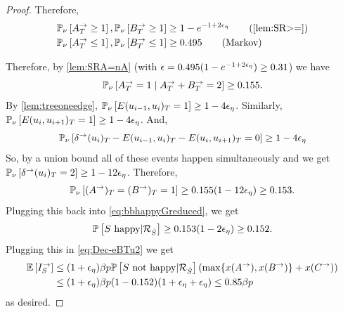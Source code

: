 \begin{proof}
Therefore,
\begin{align*}
&\PP{\nu}{A^\rightarrow_T \ge 1}, \PP{\nu}{B^\rightarrow_T\geq 1} \geq 1-e^{-1+2\eps_\eta}
 \tag{\cref{lem:SR>=}} \\
&\PP{\nu}{A^\rightarrow_T\leq 1},\PP{\nu}{B^\rightarrow_T\leq 1} \geq 0.495 \tag{Markov}
\end{align*}


Therefore, by \cref{lem:SRA=nA} (with ${\epsilon}=0.495(1-e^{-1+2{\epsilon}_\eta})\geq 0.31$) we have
$${\mathbb{P}}_{\nu}\left[A^\rightarrow_T =1 \mid A^\rightarrow_T + B^\rightarrow_T = 2\right] \ge 0.155.$$ 
By \cref{lem:treeoneedge}, 
${\mathbb{P}}_{\nu}\left[E(u_{i-1},u_i)_T=1\right]\geq 1-4{\epsilon}_\eta$. Similarly, ${\mathbb{P}}_{\nu}\left[E(u_{i},u_{i+1})_T=1\right]\geq 1-4{\epsilon}_\eta$. And, 
$${\mathbb{P}}_{\nu}\left[\delta^\rightarrow(u_i)_T- E(u_{i-1},u_i)_T -E(u_i,u_{i+1})_T=0\right] \geq 1-4{\epsilon}_\eta$$
So, by a union bound all of these events happen simultaneously and we get ${\mathbb{P}}_{\nu}\left[\delta^\rightarrow(u_i)_T=2\right]\geq 1-12{\epsilon}_\eta$.
Therefore,
$$ {\mathbb{P}}_{\nu}\left[(A^\rightarrow)_T=(B^\rightarrow)_T=1\right] \geq 0.155 (1-12{\epsilon}_\eta) \ge 0.153.$$
Plugging this back into \eqref{eq:bbhappyGreduced}, we get
$$ {\mathbb{P}}\left[S\text{ happy} | {\mathcal{R}}_{\hat{S}}\right]\geq 0.153(1-2{\epsilon}_\eta) \ge 0.152.$$
Plugging this in \eqref{eq:Dec-eBTu2}
we get
\begin{align*} {\mathbb{E}}\left[I_S^\rightarrow\right]&\leq (1+{\epsilon}_\eta)\beta p {\mathbb{P}}\left[S\text{ not happy}|{\mathcal{R}}_{\hat{S}}\right](\max\{x(A^\rightarrow),x(B^\rightarrow)\} + x(C^\rightarrow)) \\
	&\leq (1+{\epsilon}_\eta) \beta p (1-0.152) (1+{\epsilon}_\eta+{\epsilon}_\eta) \leq 0.85 \beta p
\end{align*}
as desired.

\end{proof}
